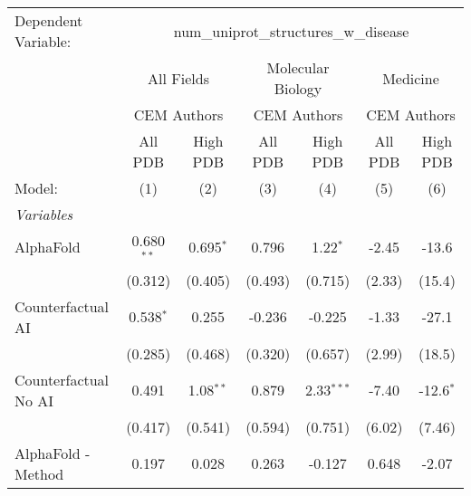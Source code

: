 \begingroup
\centering
\begin{tabular}{lcccccc}
   \tabularnewline \midrule \midrule
   Dependent Variable: & \multicolumn{6}{c}{num\_uniprot\_structures\_w\_disease}\\
 & \multicolumn{2}{c}{All Fields} & \multicolumn{2}{c}{Molecular Biology} & \multicolumn{2}{c}{Medicine} \\
\cmidrule(lr){2-3} \cmidrule(lr){4-5} \cmidrule(lr){6-7}
 & \multicolumn{2}{c}{CEM Authors} & \multicolumn{2}{c}{CEM Authors} & \multicolumn{2}{c}{CEM Authors} \\
\cmidrule(lr){2-3} \cmidrule(lr){4-5} \cmidrule(lr){6-7}
 & \multicolumn{1}{c}{All PDB} & \multicolumn{1}{c}{High PDB} & \multicolumn{1}{c}{All PDB} & \multicolumn{1}{c}{High PDB} & \multicolumn{1}{c}{All PDB} & \multicolumn{1}{c}{High PDB} \\
\cmidrule(lr){2-2} \cmidrule(lr){3-3} \cmidrule(lr){4-4} \cmidrule(lr){5-5} \cmidrule(lr){6-6} \cmidrule(lr){7-7}
   Model:                                                     & (1)           & (2)          & (3)           & (4)           & (5)           & (6)\\  
   \midrule
   \emph{Variables}\\
   AlphaFold                                                  & 0.680$^{**}$  & 0.695$^{*}$  & 0.796         & 1.22$^{*}$    & -2.45         & -13.6\\   
                                                              & (0.312)       & (0.405)      & (0.493)       & (0.715)       & (2.33)        & (15.4)\\   
   Counterfactual AI                                          & 0.538$^{*}$   & 0.255        & -0.236        & -0.225        & -1.33         & -27.1\\   
                                                              & (0.285)       & (0.468)      & (0.320)       & (0.657)       & (2.99)        & (18.5)\\   
   Counterfactual No AI                                       & 0.491         & 1.08$^{**}$  & 0.879         & 2.33$^{***}$  & -7.40         & -12.6$^{*}$\\   
                                                              & (0.417)       & (0.541)      & (0.594)       & (0.751)       & (6.02)        & (7.46)\\   
   AlphaFold - Method                                         & 0.197         & 0.028        & 0.263         & -0.127        & 0.648         & -2.07\\   

\end{tabular}

